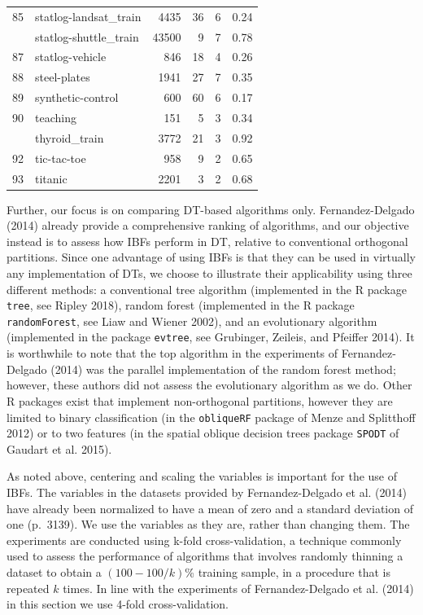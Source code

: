 \documentclass[]{elsarticle} %
\begin{document}
\begin{longtable}[t]{rlrrrr}
85 & statlog-landsat\_train & 4435 & 36 & 6 & 0.24\\
\addlinespace
86 & statlog-shuttle\_train & 43500 & 9 & 7 & 0.78\\
87 & statlog-vehicle & 846 & 18 & 4 & 0.26\\
88 & steel-plates & 1941 & 27 & 7 & 0.35\\
89 & synthetic-control & 600 & 60 & 6 & 0.17\\
90 & teaching & 151 & 5 & 3 & 0.34\\
\addlinespace
91 & thyroid\_train & 3772 & 21 & 3 & 0.92\\
92 & tic-tac-toe & 958 & 9 & 2 & 0.65\\
93 & titanic & 2201 & 3 & 2 & 0.68\\*
\end{longtable}

Further, our focus is on comparing DT-based algorithms only.
Fernandez-Delgado (2014) already provide a comprehensive ranking of
algorithms, and our objective instead is to assess how IBFs perform in
DT, relative to conventional orthogonal partitions. Since one advantage
of using IBFs is that they can be used in virtually any implementation
of DTs, we choose to illustrate their applicability using three
different methods: a conventional tree algorithm (implemented in the R
package \texttt{tree}, see Ripley 2018), random forest (implemented in
the R package \texttt{randomForest}, see Liaw and Wiener 2002), and an
evolutionary algorithm (implemented in the package \texttt{evtree}, see
Grubinger, Zeileis, and Pfeiffer 2014). It is worthwhile to note that
the top algorithm in the experiments of Fernandez-Delgado (2014) was the
parallel implementation of the random forest method; however, these
authors did not assess the evolutionary algorithm as we do. Other R
packages exist that implement non-orthogonal partitions, however they
are limited to binary classification (in the \texttt{obliqueRF} package
of Menze and Splitthoff 2012) or to two features (in the spatial oblique
decision trees package \texttt{SPODT} of Gaudart et al. 2015).

As noted above, centering and scaling the variables is important for the
use of IBFs. The variables in the datasets provided by Fernandez-Delgado
et al. (2014) have already been normalized to have a mean of zero and a
standard deviation of one (p.~3139). We use the variables as they are,
rather than changing them. The experiments are conducted using k-fold
cross-validation, a technique commonly used to assess the performance of
algorithms that involves randomly thinning a dataset to obtain a
\((100 - 100/k)\)\% training sample, in a procedure that is repeated
\(k\) times. In line with the experiments of Fernandez-Delgado et al.
(2014) in this section we use 4-fold cross-validation.
\end{document}
